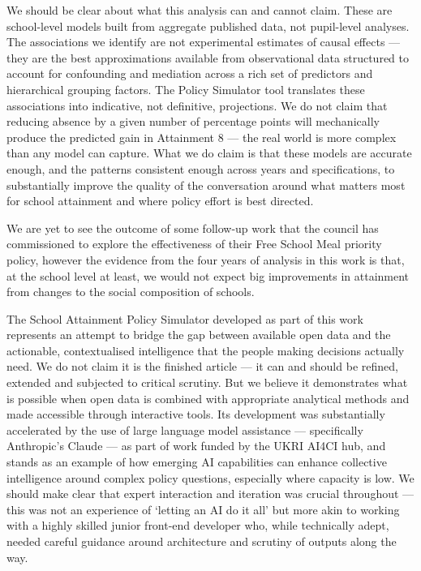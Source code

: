 \documentclass[
  11pt,
]{article}
\begin{document}
We should be clear about what this analysis can and cannot claim. These
are school-level models built from aggregate published data, not
pupil-level analyses. The associations we identify are not experimental
estimates of causal effects --- they are the best approximations
available from observational data structured to account for confounding
and mediation across a rich set of predictors and hierarchical grouping
factors. The Policy Simulator tool translates these associations into
indicative, not definitive, projections. We do not claim that reducing
absence by a given number of percentage points will mechanically produce
the predicted gain in Attainment 8 --- the real world is more complex
than any model can capture. What we do claim is that these models are
accurate enough, and the patterns consistent enough across years and
specifications, to substantially improve the quality of the conversation
around what matters most for school attainment and where policy effort
is best directed.

We are yet to see the outcome of some follow-up work that the council
has commissioned to explore the effectiveness of their Free School Meal
priority policy, however the evidence from the four years of analysis in
this work is that, at the school level at least, we would not expect big
improvements in attainment from changes to the social composition of
schools.

The School Attainment Policy Simulator developed as part of this work
represents an attempt to bridge the gap between available open data and
the actionable, contextualised intelligence that the people making
decisions actually need. We do not claim it is the finished article ---
it can and should be refined, extended and subjected to critical
scrutiny. But we believe it demonstrates what is possible when open data
is combined with appropriate analytical methods and made accessible
through interactive tools. Its development was substantially accelerated
by the use of large language model assistance --- specifically
Anthropic's Claude --- as part of work funded by the UKRI AI4CI hub, and
stands as an example of how emerging AI capabilities can enhance
collective intelligence around complex policy questions, especially
where capacity is low. We should make clear that expert interaction and
iteration was crucial throughout --- this was not an experience of
`letting an AI do it all' but more akin to working with a highly skilled
junior front-end developer who, while technically adept, needed careful
guidance around architecture and scrutiny of outputs along the way.
\end{document}
